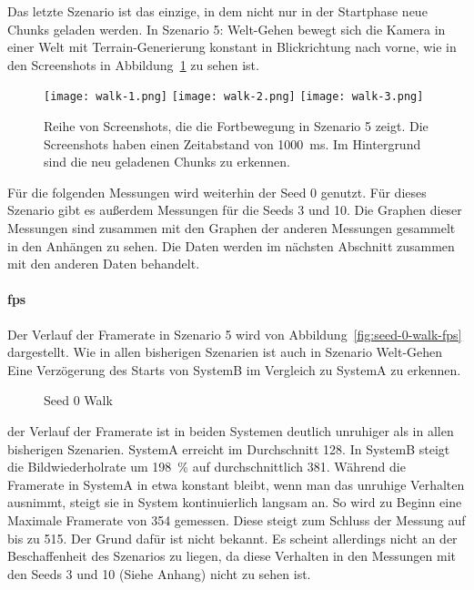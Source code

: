 Das letzte Szenario ist das einzige, in dem nicht nur in der Startphase neue Chunks geladen werden. In Szenario 5: Welt-Gehen bewegt sich die Kamera in einer Welt mit Terrain-Generierung konstant in Blickrichtung nach vorne, wie in den Screenshots in Abbildung~\ref{fig:walk} zu sehen ist.
\begin{figure}[!htbp]
	\centering
	\texttt{[image: walk-1.png]}
	\texttt{[image: walk-2.png]}
	\texttt{[image: walk-3.png]}
	\caption[Reihe von Screenshots, die die Fortbewegung in Szenario 5 zeigt.]{Reihe von Screenshots, die die Fortbewegung in Szenario 5 zeigt. Die Screenshots haben einen Zeitabstand von \SI{1000}{\milli\second}. Im Hintergrund sind die neu geladenen Chunks zu erkennen.}\label{fig:walk}
\end{figure}

Für die folgenden Messungen wird weiterhin der Seed 0 genutzt. Für dieses Szenario gibt es außerdem Messungen für die Seeds 3 und 10. Die Graphen dieser Messungen sind zusammen mit den Graphen der anderen Messungen gesammelt in den Anhängen zu sehen. Die Daten werden im nächsten Abschnitt zusammen mit den anderen Daten behandelt.

\paragraph{\ac{fps}}
Der Verlauf der Framerate in Szenario 5 wird von Abbildung~\vref{fig:seed-0-walk-fps} dargestellt. Wie in allen bisherigen Szenarien ist auch in Szenario Welt-Gehen Eine Verzögerung des Starts von SystemB im Vergleich zu SystemA zu erkennen.
\begin{figure}[!htbp]
	\caption{Seed 0 Walk}\label{fig:seed-0-walk-fps}
\end{figure}
der Verlauf der Framerate ist in beiden Systemen deutlich unruhiger als in allen bisherigen Szenarien. SystemA erreicht im Durchschnitt \SI{128}{\fps}. In SystemB steigt die Bildwiederholrate um \SI{198}{\percent} auf durchschnittlich \SI{381}{\fps}. Während die Framerate in SystemA in etwa konstant bleibt, wenn man das unruhige Verhalten ausnimmt, steigt sie in System kontinuierlich langsam an. So wird zu Beginn eine Maximale Framerate von \SI{354}{\fps} gemessen. Diese steigt zum Schluss der Messung auf bis zu \SI{515}{\fps}. Der Grund dafür ist nicht bekannt. Es scheint allerdings nicht an der Beschaffenheit des Szenarios zu liegen, da diese Verhalten in den Messungen mit den Seeds 3 und 10 (Siehe Anhang) nicht zu sehen ist.

